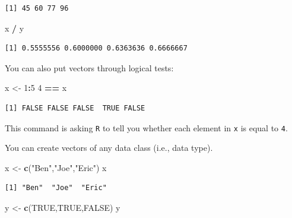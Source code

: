 \documentclass[
]{book}
\newenvironment{Shaded}{\begin{snugshade}}{\end{snugshade}}
\newcommand{\DecValTok}[1]{\textcolor[rgb]{0.00,0.00,0.81}{#1}}
\newcommand{\KeywordTok}[1]{\textcolor[rgb]{0.13,0.29,0.53}{\textbf{#1}}}
\newcommand{\NormalTok}[1]{#1}
\newcommand{\OperatorTok}[1]{\textcolor[rgb]{0.81,0.36,0.00}{\textbf{#1}}}
\newcommand{\OtherTok}[1]{\textcolor[rgb]{0.56,0.35,0.01}{#1}}
\newcommand{\StringTok}[1]{\textcolor[rgb]{0.31,0.60,0.02}{#1}}
\begin{document}
\begin{verbatim}
[1] 45 60 77 96
\end{verbatim}

\begin{Shaded}
\begin{Highlighting}[]
\NormalTok{x }\OperatorTok{/}\StringTok{ }\NormalTok{y}
\end{Highlighting}
\end{Shaded}

\begin{verbatim}
[1] 0.5555556 0.6000000 0.6363636 0.6666667
\end{verbatim}

You can also put vectors through logical tests:

\begin{Shaded}
\begin{Highlighting}[]
\NormalTok{x <-}\StringTok{ }\DecValTok{1}\OperatorTok{:}\DecValTok{5}
\DecValTok{4} \OperatorTok{==}\StringTok{ }\NormalTok{x}
\end{Highlighting}
\end{Shaded}

\begin{verbatim}
[1] FALSE FALSE FALSE  TRUE FALSE
\end{verbatim}

This command is asking \texttt{R} to tell you whether each element in \texttt{x} is equal to \texttt{4}.

You can create vectors of any data class (i.e., data type).

\begin{Shaded}
\begin{Highlighting}[]
\NormalTok{x <-}\StringTok{ }\KeywordTok{c}\NormalTok{(}\StringTok{"Ben"}\NormalTok{,}\StringTok{"Joe"}\NormalTok{,}\StringTok{"Eric"}\NormalTok{) }
\NormalTok{x}
\end{Highlighting}
\end{Shaded}

\begin{verbatim}
[1] "Ben"  "Joe"  "Eric"
\end{verbatim}

\begin{Shaded}
\begin{Highlighting}[]
\NormalTok{y <-}\StringTok{ }\KeywordTok{c}\NormalTok{(}\OtherTok{TRUE}\NormalTok{,}\OtherTok{TRUE}\NormalTok{,}\OtherTok{FALSE}\NormalTok{)}
\NormalTok{y}
\end{Highlighting}
\end{Shaded}
\end{document}
